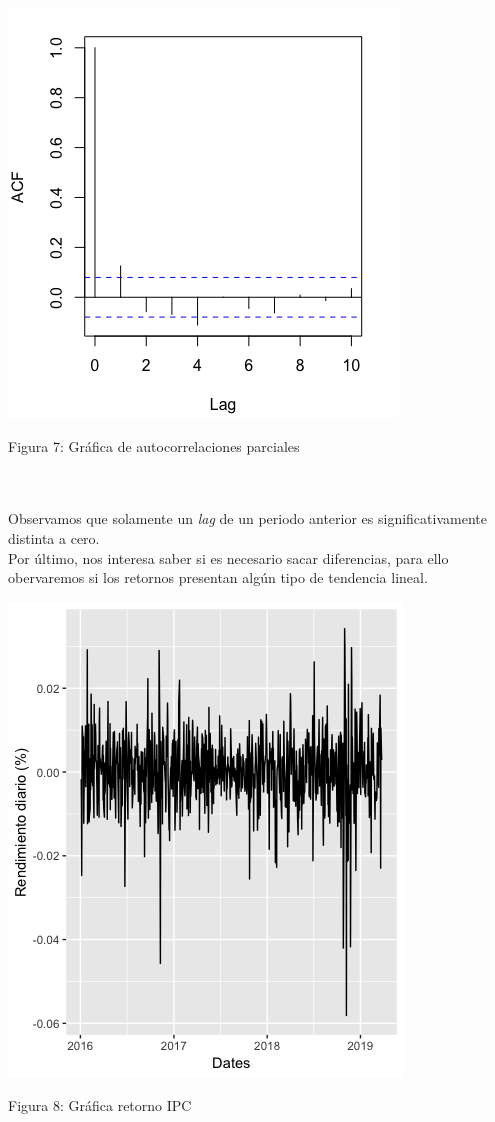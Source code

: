 \documentclass[12pt,reqno,letter]{article}
\newenvironment{fig2}[1][\unskip]{}{} %
\begin{document}
\begin{multicols}{2}
\begin{fig2}\includegraphics[scale=0.5]{img/PACF.png}
\caption{Figura 7: Gráfica de autocorrelaciones parciales}\end{fig2}

\\\\
Observamos que solamente un \textit{lag} de un periodo anterior es significativamente distinta a cero. \\

Por último, nos interesa saber si es necesario sacar diferencias, para ello obervaremos si los retornos presentan algún tipo de tendencia lineal. 

\begin{fig2}\includegraphics[scale=0.5]{img/IPC.png}
\caption{Figura 8: Gráfica retorno IPC}\end{fig2}
\\\\


\end{multicols}
\end{document}
